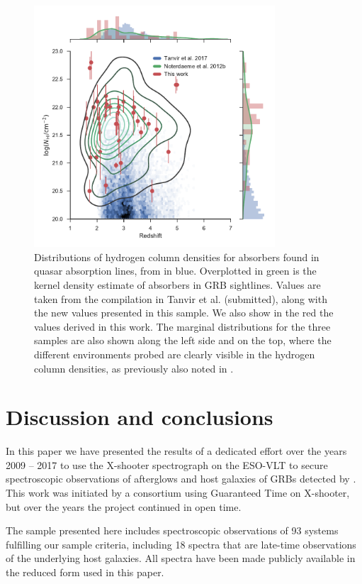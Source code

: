 \documentclass{aa}    %
\begin{document}
\begin{figure}[!ht]
	\centering \includegraphics[width=9cm]{figures/NH_dist.pdf}
\caption{Distributions of hydrogen column densities for absorbers found in
	quasar absorption lines, from \citet{Noterdaeme2012b} in blue. Overplotted in
	green is the kernel density estimate of absorbers in GRB sightlines. Values are
	taken from the compilation in Tanvir et al. (submitted), along with the new
	values presented in this sample. We also show in the red the values derived in
	this work. The marginal distributions for the three samples are also shown
	along the left side and on the top, where the different environments probed are
	clearly visible in the hydrogen column densities, as previously also noted in
	\citet{Fynbo2009}.} \label{fig:NH_dist}
\end{figure}



\section{Discussion and conclusions}\label{conclusions}

In this paper we have presented the results of a dedicated effort over the years
2009 -- 2017 to use the X-shooter spectrograph on the ESO-VLT to secure
spectroscopic observations of afterglows and host galaxies of GRBs detected by
\swift. This work was initiated by a consortium using Guaranteed Time on
X-shooter, but over the years the project continued in open time.

The sample presented here includes spectroscopic observations of 93 systems
fulfilling our sample criteria, including 18 spectra that are late-time
observations of the underlying host galaxies. All spectra have been made
publicly available in the reduced form used in this paper.
\end{document}
